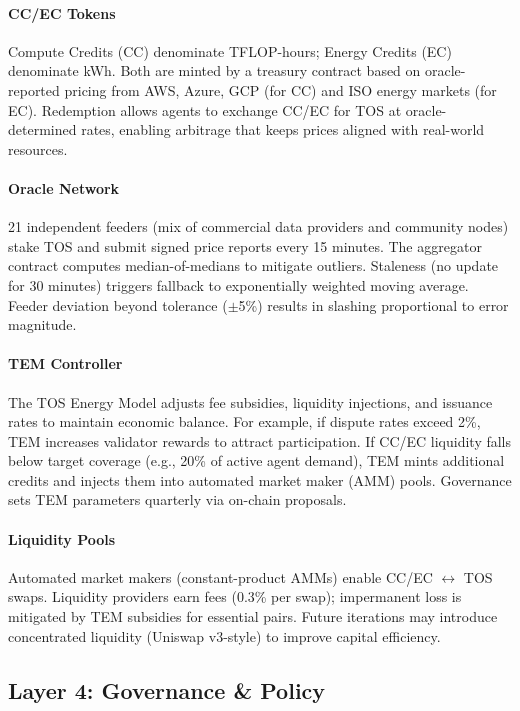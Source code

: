 \documentclass[11pt]{article}
\begin{document}
\paragraph{CC/EC Tokens} Compute Credits (CC) denominate TFLOP-hours; Energy Credits (EC) denominate kWh. Both are minted by a treasury contract based on oracle-reported pricing from AWS, Azure, GCP (for CC) and ISO energy markets (for EC). Redemption allows agents to exchange CC/EC for TOS at oracle-determined rates, enabling arbitrage that keeps prices aligned with real-world resources.

\paragraph{Oracle Network} 21 independent feeders (mix of commercial data providers and community nodes) stake TOS and submit signed price reports every 15 minutes. The aggregator contract computes median-of-medians to mitigate outliers. Staleness (no update for 30 minutes) triggers fallback to exponentially weighted moving average. Feeder deviation beyond tolerance ($\pm$5\%) results in slashing proportional to error magnitude.

\paragraph{TEM Controller} The TOS Energy Model adjusts fee subsidies, liquidity injections, and issuance rates to maintain economic balance. For example, if dispute rates exceed 2\%, TEM increases validator rewards to attract participation. If CC/EC liquidity falls below target coverage (e.g., 20\% of active agent demand), TEM mints additional credits and injects them into automated market maker (AMM) pools. Governance sets TEM parameters quarterly via on-chain proposals.

\paragraph{Liquidity Pools} Automated market makers (constant-product AMMs) enable CC/EC $\leftrightarrow$ TOS swaps. Liquidity providers earn fees (0.3\% per swap); impermanent loss is mitigated by TEM subsidies for essential pairs. Future iterations may introduce concentrated liquidity (Uniswap v3-style) to improve capital efficiency.

\subsection{Layer 4: Governance \& Policy}
\end{document}
